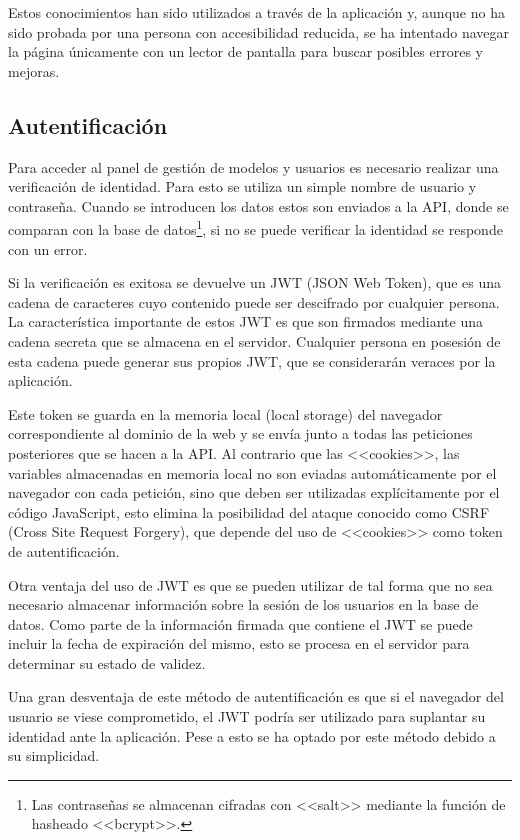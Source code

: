 Estos conocimientos han sido utilizados a través de la aplicación y, aunque no
ha sido probada por una persona con accesibilidad reducida, se ha intentado
navegar la página únicamente con un lector de pantalla para buscar posibles
errores y mejoras.

\subsection{Autentificación}

Para acceder al panel de gestión de modelos y usuarios es necesario realizar una
verificación de identidad. Para esto se utiliza un simple nombre de usuario y
contraseña. Cuando se introducen los datos estos son enviados a la API, donde se
comparan con la base de datos\footnote{Las contraseñas se almacenan cifradas con
<<salt>> mediante la función de hasheado <<bcrypt>>.}, si no se puede verificar
la identidad se responde con un error.

Si la verificación es exitosa se devuelve un JWT (JSON Web Token), que es una
cadena de caracteres cuyo contenido puede ser descifrado por cualquier persona.
La característica importante de estos JWT es que son firmados mediante una
cadena secreta que se almacena en el servidor. Cualquier persona en posesión de
esta cadena puede generar sus propios JWT, que se considerarán veraces por la
aplicación.

Este token se guarda en la memoria local (local storage) del navegador
correspondiente al dominio de la web y se envía junto a todas las peticiones
posteriores que se hacen a la API. Al contrario que las <<cookies>>, las
variables almacenadas en memoria local no son eviadas automáticamente por el
navegador con cada petición, sino que deben ser utilizadas explícitamente por el
código JavaScript, esto elimina la posibilidad del ataque conocido como CSRF
(Cross Site Request Forgery), que depende del uso de <<cookies>> como token de
autentificación.

Otra ventaja del uso de JWT es que se pueden utilizar de tal forma que no sea
necesario almacenar información sobre la sesión de los usuarios en la base de
datos. Como parte de la información firmada que contiene el JWT se puede incluir
la fecha de expiración del mismo, esto se procesa en el servidor para determinar
su estado de validez.

Una gran desventaja de este método de autentificación es que si el navegador del
usuario se viese comprometido, el JWT podría ser utilizado para suplantar su
identidad ante la aplicación. Pese a esto se ha optado por este método debido a
su simplicidad.
